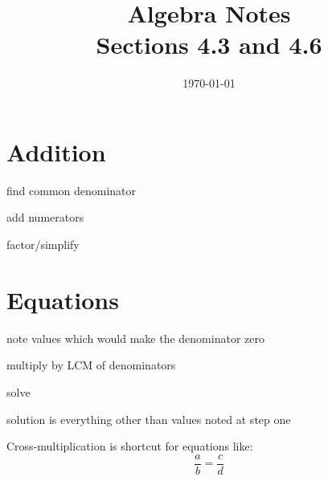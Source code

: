 \documentclass[letterpaper]{article}
\title{Algebra Notes \\ Sections 4.3 and 4.6}
\author{}
\date{\today}
\begin{document}
  \maketitle
  
  \section{Addition} %

  \begin{itemize*}
    \item find common denominator
    \item add numerators
    \item factor/simplify
  \end{itemize*}

  \section{Equations} %

  \begin{itemize*}
    \item note values which would make the denominator zero
    \item multiply by LCM of denominators
    \item solve
    \item solution is everything other than values noted at step one
  \end{itemize*}

  Cross-multiplication is shortcut for equations like:
  \[
    \frac{a}{b} = \frac{c}{d}
  \]
  
\end{document}
